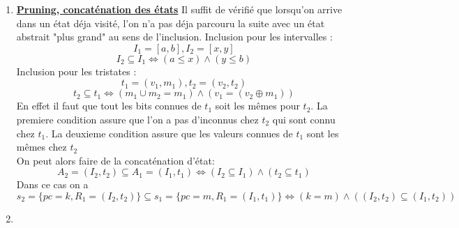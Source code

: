 \documentclass[a4paper,french, 12pt]{article}
\begin{document}
\begin{enumerate}
\begin{center}
\begin{tikzpicture}[auto]
			\end{tikzpicture}
		\end{center}
		Avec en entrée par exemple $R_1 = [0;10]$, on exécute ainsi :
		\begin{enumerate}[label=\textbf{I.\arabic*}]
			\item On a pas assez d'information pour savoir quelle branche prendre. On coupe est on prend la branche sans le saut.
			 On a donc $R_1=[0,4]$ passé à l'instruction 2. On stocke $R_1 = [5,10]$ et pc = 3 pour la suite.
			\item De pc = 2, $R_1=[0,4]$ on passe à pc = 3, $R_1 = [5,9]$
			\item De pc = 3, $R_1 = [5,9]$ on passe à pc = 4, $R_1 = [10,18]$
			\item On continue jusque exit. Puis on retourne à la valeur stockés.
			\item De pc = 3, $R_1 = [5,10]$ on passe à pc = 4, $R_1 = [10,20]$. Il est important de remarqué que ici, l'instruction 3 à déja ete visité.
			 Lors du passage précedent, on avait $R_1 = [5,9]$. Si l'on avait eu par exemple $R_1 = [5,11]$ alors on aurait pu s'arreter là car on aurait déja parcouru toute les branches avec un état abstrait incluant $R_1 = [5,10]$
			\item On continue jusque exit. 
		\end{enumerate}
	\item \textbf{\underline{Pruning, concaténation des états}}
		Il suffit de vérifié que lorsqu'on arrive dans un état déja visité, l'on n'a pas déja parcouru la suite avec un état abstrait "plus grand" au sens de l'inclusion.
		Inclusion pour les intervalles :\\
		$$ I_1 = [a,b], I_2 = [x,y]$$
		$$ I_2 \subseteq I_1\Leftrightarrow (a\leq x) \wedge (y\leq b)$$  
		Inclusion pour les tristates :\\
		$$ t_1 = (v_1,m_1), t_2 = (v_2, t_2) $$
		$$ t_2 \subseteq t_1\Leftrightarrow (m_1 \cup m_2 = m_1)\wedge (v_1 = (v_2 \oplus m_1))$$
		En effet il faut que tout les bits connues de $t_1$ soit les mêmes pour $t_2$. La premiere condition assure que l'on a pas d'inconnus chez $t_2$ qui sont connu chez $t_1$. La deuxieme condition assure que les valeurs connues de $t_1$ sont les mêmes chez $t_2$\\

		On peut alors faire de la concaténation d'état:
		$$A_2 = (I_2, t_2) \subseteq A_1 = (I_1, t_1) \Leftrightarrow (I_2 \subseteq I_1)\wedge(t_2 \subseteq t_1)$$
		Dans ce cas on a $$s_2 = \{pc=k, R_1 = (I_2, t_2)\} \subseteq s_1 = \{pc=m, R_1 = (I_1, t_1)\}\Leftrightarrow (k=m)\wedge((I_2,t_2)\subseteq(I_1,t_2))$$

	\item 
	\end{enumerate}
\end{document}
